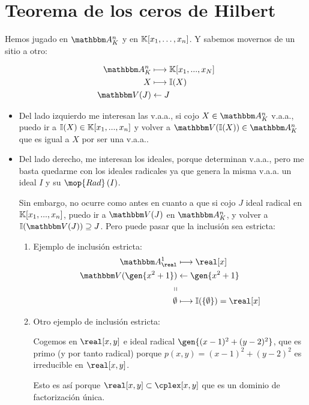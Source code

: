 \chapter{Teorema de los ceros de Hilbert}

Hemos jugado en $\Akn$ y en $\mathbb{K}[x_1,\dotsc,x_n]$. Y sabemos movernos de un sitio a otro:

\begin{align*}
	\Akn & \longmapsto  \K[x_1,...,x_N] \\
	X & \longmapsto  \I(X) \\
	\V(J) & \leftarrow  J \\
\end{align*}

\begin{itemize}
	\item Del lado izquierdo me interesan las v.a.a., si cojo $X\in \Akn$ v.a.a., puedo ir a $\mathbb{I}(X) \in \mathbb{K}[x_1,...,x_n]$ y volver a $\V(\I(X)) \in \Akn$ que es igual a $X$ por ser una v.a.a..

	\item Del lado derecho, me interesan los ideales, porque determinan v.a.a., pero me basta quedarme con los ideales radicales ya que genera la misma v.a.a. un ideal $I$ y su $\mop{Rad}\,(I)$.

	Sin embargo, no ocurre como antes en cuanto a que si cojo $J$ ideal radical en $\mathbb{K}[x_1,...,x_n]$, puedo ir a $\V(J)$ en $\Akn$, y volver a $\I(\V(J)) \supseteq J$. Pero puede pasar que la inclusión sea estricta:
	\begin{example}
		\begin{enumerate}
			\item Ejemplo de inclusión estricta:
			\begin{align*}
				\A^1_{\real} & \longmapsto  \real[x] \\
				\V(\gen{x^2+1}) & \leftarrow  \gen{x^2+1} \\
				\shortparallel & \\
				\emptyset & \longmapsto  \I(\{ \emptyset \})=\real[x] \\
			\end{align*}
			\item Otro ejemplo de inclusión estricta:

			Cogemos en $\real[x,y]$ e ideal  radical $\gen{(x-1)^2+(y-2)^2}$, que es primo (y por tanto radical) porque $p(x,y)=(x-1)^2+(y-2)^2$ es irreducible en $\real[x,y]$.

			Esto es así porque $\real[x,y] \subset \cplex[x,y]$  que es un dominio de factorización única.


\end{enumerate}
\end{example}
\end{itemize}
